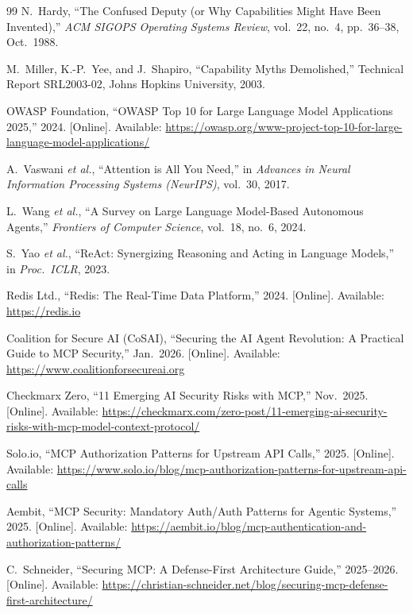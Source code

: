 \documentclass[journal]{IEEEtran}
\begin{document}
\begin{thebibliography}{99}
N.\ Hardy,
``The Confused Deputy (or Why Capabilities Might Have Been Invented),''
\textit{ACM SIGOPS Operating Systems Review},
vol.\ 22, no.\ 4, pp.\ 36--38, Oct.\ 1988.

M.\ Miller, K.-P.\ Yee, and J.\ Shapiro,
``Capability Myths Demolished,''
Technical Report SRL2003-02, Johns Hopkins University, 2003.

OWASP Foundation,
``OWASP Top 10 for Large Language Model Applications 2025,'' 2024.
[Online]. Available:
\url{https://owasp.org/www-project-top-10-for-large-language-model-applications/}

A.\ Vaswani \textit{et al.},
``Attention is All You Need,''
in \textit{Advances in Neural Information Processing Systems (NeurIPS)},
vol.\ 30, 2017.

L.\ Wang \textit{et al.},
``A Survey on Large Language Model-Based Autonomous Agents,''
\textit{Frontiers of Computer Science}, vol.\ 18, no.\ 6, 2024.

S.\ Yao \textit{et al.},
``ReAct: Synergizing Reasoning and Acting in Language Models,''
in \textit{Proc.\ ICLR}, 2023.

Redis Ltd., ``Redis: The Real-Time Data Platform,'' 2024.
[Online]. Available: \url{https://redis.io}

Coalition for Secure AI (CoSAI),
``Securing the AI Agent Revolution: A Practical Guide to MCP Security,''
Jan.\ 2026.
[Online]. Available: \url{https://www.coalitionforsecureai.org}

Checkmarx Zero,
``11 Emerging AI Security Risks with MCP,'' Nov.\ 2025.
[Online]. Available:
\url{https://checkmarx.com/zero-post/11-emerging-ai-security-risks-with-mcp-model-context-protocol/}

Solo.io,
``MCP Authorization Patterns for Upstream API Calls,'' 2025.
[Online]. Available:
\url{https://www.solo.io/blog/mcp-authorization-patterns-for-upstream-api-calls}

Aembit,
``MCP Security: Mandatory Auth/Auth Patterns for Agentic Systems,'' 2025.
[Online]. Available:
\url{https://aembit.io/blog/mcp-authentication-and-authorization-patterns/}

C.\ Schneider,
``Securing MCP: A Defense-First Architecture Guide,'' 2025--2026.
[Online]. Available:
\url{https://christian-schneider.net/blog/securing-mcp-defense-first-architecture/}


\end{thebibliography}
\end{document}
